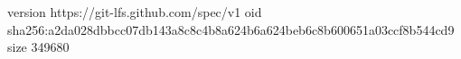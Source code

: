 version https://git-lfs.github.com/spec/v1
oid sha256:a2da028dbbcc07db143a8c8c4b8a624b6a624beb6c8b600651a03ccf8b544cd9
size 349680
